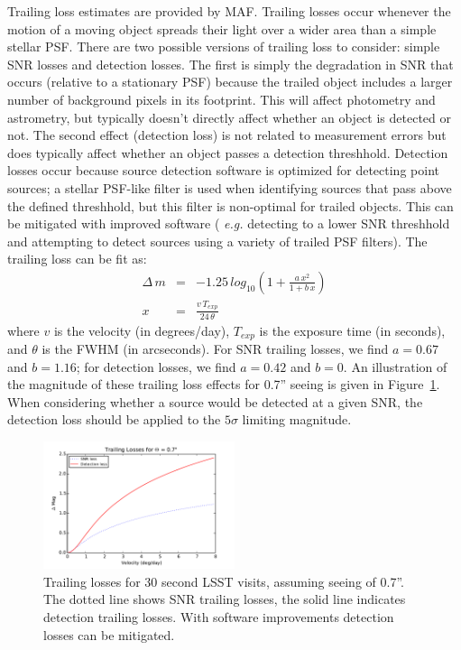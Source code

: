 \documentclass{iau}
\begin{document}
Trailing loss estimates are provided by MAF. Trailing losses occur
whenever the motion of a moving object spreads their light over a
wider area than a simple stellar PSF. There are two possible versions
of trailing loss to consider: simple SNR losses and detection losses.
The first is simply the degradation in SNR that occurs (relative to a
stationary PSF) because the trailed object includes a larger number of
background pixels in its footprint. This will affect photometry and
astrometry, but typically doesn't directly affect whether an object is
detected or not. The second effect (detection loss) is not related to
measurement errors but does typically affect whether an object passes
a detection threshhold. Detection losses occur because source
detection software is optimized for detecting point sources;
a stellar PSF-like filter is used when identifying sources that pass
above the defined threshhold, but this filter is non-optimal for
trailed objects. This can be mitigated with improved software ({\it
e.g.} detecting to a lower SNR threshhold and attempting to detect
sources using a variety of trailed PSF filters). The trailing loss can
be fit as:
\begin{eqnarray}
\Delta \, m & = &-1.25 \, log_{10} \left( 1 + \frac{a \, x^2} { 1 + b\,
    x} \right) \\
x & = & \frac{v \, T_{exp}} {24 \, \theta} 
\end{eqnarray}
where $v$ is the velocity (in degrees/day), $T_{exp}$ is the exposure
time (in seconds), and $\theta$ is the FWHM (in arcseconds). For
SNR trailing losses, we find $a = 0.67$ and $b = 1.16$; for
detection losses, we find $a=0.42$ and $b=0$. An illustration of the
magnitude of these trailing loss effects for 0.7'' seeing is given in
Figure~\ref{trailinglosses}. When considering whether a source would
be detected at a given SNR, the detection loss should be applied to the
$5\sigma$ limiting magnitude.

\begin{figure}
\centering
\includegraphics[width=0.5\textwidth]{trailing_losses}
\caption{Trailing losses for 30 second LSST visits, assuming seeing of
  0.7''. The dotted line shows SNR trailing losses, the solid line
  indicates  detection trailing losses. With software improvements
  detection losses can be mitigated.
\label{trailinglosses}}
\end{figure}
\end{document}
